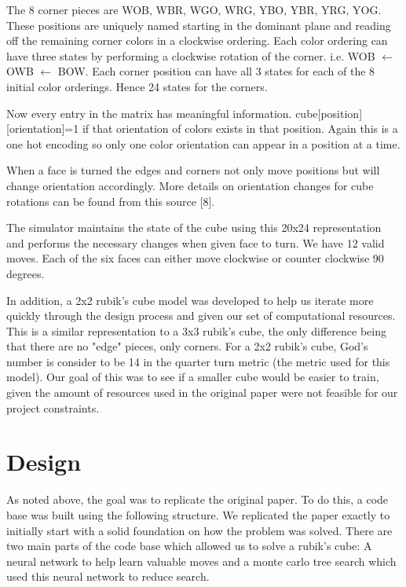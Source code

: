 \documentclass[10pt,twocolumn,letterpaper]{article}
\begin{document}
The 8 corner pieces are WOB, WBR, WGO, WRG, YBO, YBR, YRG, YOG.  These positions are uniquely named starting in the dominant plane and reading off the remaining corner colors in a clockwise ordering.  Each color ordering can have three states by performing a clockwise rotation of the corner.  i.e. WOB $\leftarrow$ OWB $\leftarrow$ BOW.  Each corner position can have all 3 states for each of the 8 initial color orderings.  Hence 24 states for the corners. 

Now every entry in the matrix has meaningful information.  cube[position][orientation]=1 if that orientation of colors exists in that position.  Again this is a one hot encoding so only one color orientation can appear in a position at a time. 

When a face is turned the edges and corners not only move positions but will change orientation accordingly.   More details on orientation changes for cube rotations can be found from this source [8].

The simulator maintains the state of the cube using this 20x24 representation and performs the necessary changes when given face to turn.  We have 12 valid moves.  Each of the six faces can either move clockwise or counter clockwise 90 degrees. 

In addition, a 2x2 rubik's cube model was developed to help us iterate more quickly through the design process and given our set of computational resources.  This is a similar representation to a 3x3 rubik's cube, the only difference being that there are no "edge" pieces, only corners.  For a 2x2 rubik's cube, God's number is consider to be 14 in the quarter turn metric (the metric used for this model). Our goal of this was to see if a smaller cube would be easier to train, given the amount of resources used in the original paper were not feasible for our project constraints. 

\section{Design}
As noted above, the goal was to replicate the original paper. To do this, a code base was built using the following structure. We replicated the paper exactly to initially start with a solid foundation on how the problem was solved. There are two main parts of the code base which allowed us to solve a rubik's cube: A neural network to help learn valuable moves and a monte carlo tree search which used this neural network to reduce search.
\end{document}
